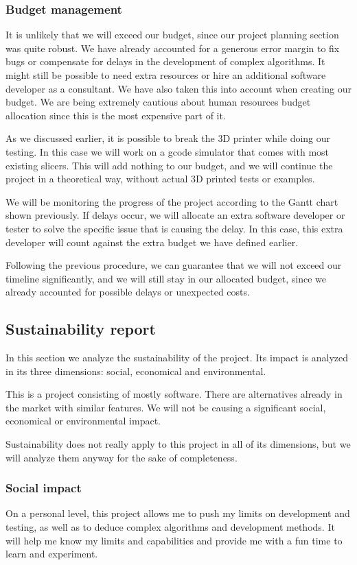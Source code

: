 \subsubsection{Budget management}
It is unlikely that we will exceed our budget, since our project planning section was quite robust. We have already accounted for a generous error margin to fix bugs or compensate for delays in the development of complex algorithms. It might still be possible to need extra resources or hire an additional software developer as a consultant. We have also taken this into account when creating our budget. We are being extremely cautious about human resources budget allocation since this is the most expensive part of it.

As we discussed earlier, it is possible to break the 3D printer while doing our testing. In this case we will work on a gcode simulator that comes with most existing slicers. This will add nothing to our budget, and we will continue the project in a theoretical way, without actual 3D printed tests or examples.

We will be monitoring the progress of the project according to the Gantt chart shown previously. If delays occur, we will allocate an extra software developer or tester to solve the specific issue that is causing the delay. In this case, this extra developer will count against the extra budget we have defined earlier.

Following the previous procedure, we can guarantee that we will not exceed our timeline significantly, and we will still stay in our allocated budget, since we already accounted for possible delays or unexpected costs.


\subsection{Sustainability report}


In this section we analyze the sustainability of the project. Its impact is analyzed in its three dimensions: social, economical and environmental.

This is a project consisting of mostly software. There are alternatives already in the market with similar features. We will not be causing a significant social, economical or environmental impact.

Sustainability does not really apply to this project in all of its dimensions, but we will analyze them anyway for the sake of completeness.

\subsubsection{Social impact}
On a personal level, this project allows me to push my limits on development and testing, as well as to deduce complex algorithms and development methods. It will help me know my limits and capabilities and provide me with a fun time to learn and experiment.

